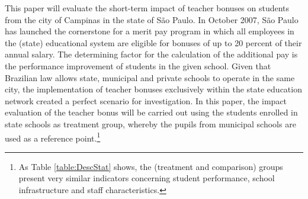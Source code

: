 \documentclass[a4paper, 12pt]{article}
\begin{document}







This paper will evaluate the short-term impact of teacher bonuses on students from the city of Campinas in the state of São Paulo. In October 2007, São Paulo has launched the cornerstone for a merit pay program in which all employees in the (state) educational system are eligible for bonuses of up to 20 percent of their annual salary. The determining factor for the calculation of the additional pay is the performance improvement of students in the given school. Given that Brazilian law allows state, municipal and private schools to operate in the same city, the implementation of teacher bonuses exclusively within the state education network created a perfect scenario for investigation. In this paper, the impact evaluation of the teacher bonus will be carried out using the students enrolled in state schools as treatment group, whereby the pupils from municipal schools are used as a reference point.\footnote{As Table \ref{table:DescStat} shows, the (treatment and comparison) groups present very similar indicators concerning student performance, school infrastructure and staff characteristics.}
\end{document}
